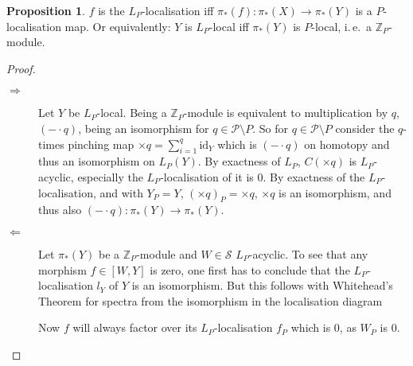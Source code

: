 \documentclass[english]{scrartcl}
\theoremstyle{definition}
\newtheorem*{Prop}{Proposition}
\theoremstyle{remark}
\newcommand*{\idest}{i.\,e.\ }
\newcommand*{\ifftext}{iff}
\newcommand*{\Z}[1][]{\mathds{Z}_{#1}}  %
\newcommand*{\id}{\text{id}}
\newcommand*{\Cone}[1]{C(#1)}
\newcommand*{\Spectra}{\mathcal{S}} %
\newcommand*{\Ps}{P}  %
\newcommand*{\PS}{\mathcal{P}} %
\newcommand*{\pistar}[2][*]{\pi_{#1}(#2)}  %
\newcommand*{\timesZ}[1][\Ps]{\otimes_{\Z} \Z[#1]}  %
\newcommand*{\LP}[1][\Ps]{L_{#1}}  %
\begin{document}
\begin{Prop}
  $f$ is the $\LP$-localisation \ifftext{}
  $\pistar f\colon \pistar X\to \pistar Y$ is a
  $\Ps$-localisation map.
  Or equivalently:
  $Y$ is $\LP$-local \ifftext{}
  $\pistar Y$ is $\Ps$-local, \idest a $\Z[\Ps]$-module.
  \begin{proof}
    \begin{description}
    \item[$\Rightarrow$] Let $Y$ be $\LP$-local.
      Being a $\Z[\Ps]$-module is equivalent to multiplication by $q$,
      $(-\cdot q)$, being an isomorphism for $q\in\PS\setminus\Ps$.
      So for $q\in\PS\setminus\Ps$ consider the $q$-times pinching map
      $\times q=\sum_{i=1}^q \id_Y$ which is $(-\cdot q)$ on homotopy
      and thus an isomorphism on $\LP(Y)$.
      By exactness of $\LP$, $\Cone{\times q}$ is $\LP$-acyclic,
      especially the $\LP$-localisation of it is 0.
      By exactness of the $\LP$-localisation, and with $Y_{\Ps}=Y$,
      $(\times q)_{\Ps}=\times q$, $\times q$ is an isomorphism, and
      thus also $(-\cdot q)\colon \pistar Y \to \pistar Y$.
    \item[$\Leftarrow$] Let $\pistar Y$ be a $\Z[\Ps]$-module and
      $W\in\Spectra$ $\LP$-acyclic.
      To see that any morphism $f\in [W,Y]$ is zero, one first has to
      conclude that the $\LP$-localisation $l_Y$ of $Y$ is an
      isomorphism. But this follows with Whitehead's Theorem for
      spectra from the isomorphism in the localisation diagram
      \begin{center}
      \end{center}
      Now $f$ will always factor over its $\LP$-localisation $f_{\Ps}$
      which is 0, as $W_{\Ps}$ is 0.
    \end{description}
  \end{proof}
\end{Prop}
\end{document}
